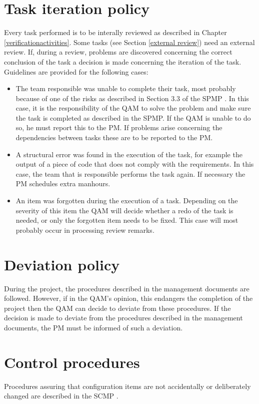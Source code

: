 \documentclass[%
		pathtobase=..,%
		titlefull={Software Validation and Verification Plan},%
		titleabbr=SVVP,%
		version=0.1]{fingerpaint}
\begin{document}
\section{Task iteration policy}
    Every task performed is to be interally reviewed as described in Chapter \ref{verificationactivities}. Some tasks (see Section \ref{external review}) need an external review.  If, during a review, problems
    are discovered concerning the correct conclusion of the task a decision is made concerning the
    iteration of the task. Guidelines are provided for the following cases:
\begin{itemize}
\item The team responsible was unable to complete their task, most probably because of one of
          the risks as described in Section 3.3 of the SPMP \cite{spmp}. In this case, it is the responsibility
          of the QAM to solve the problem and make sure the task is completed as described in the
          SPMP. If the QAM is unable to do so, he must report this to the PM. If problems arise
          concerning the dependencies between tasks these are to be reported to the PM.
\item A structural error was found in the execution of the task, for example the output of a piece
          of code that does not comply with the requirements.
          In this case, the team that is responsible performs the task again. If necessary the PM
          schedules extra manhours.
\item An item was forgotten during the execution of a task.
          Depending on the severity of this item the QAM will decide whether a redo of the task is
          needed, or only the forgotten item needs to be fixed. This case will most probably occur in
          processing review remarks.
\end {itemize}
\section{Deviation policy}
    During the project, the procedures described in the management documents
    are followed. However, if in the QAM’s opinion, this endangers the completion of the
    project then the QAM can decide to deviate from these procedures. If the decision is made
    to deviate from the procedures described in the management documents, the PM must be
    informed of such a deviation.

\section{Control procedures}
Procedures assuring that configuration items are not accidentally or deliberately changed are
described in the SCMP \cite{scmp}.
\end{document}
